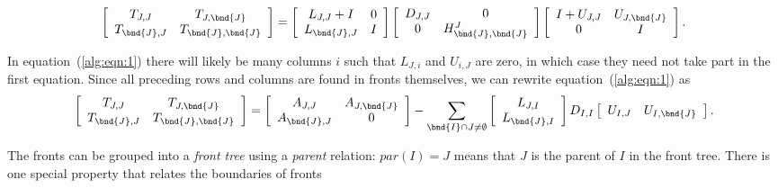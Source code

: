 \begin{equation}
\label{alg:eqn:2}
\left \lbrack \begin{array}{cc}
T_{J,J} & T_{J, \bnd{J}} \\
T_{\bnd{J},J} & T_{\bnd{J},\bnd{J}}
\end{array} \right \rbrack
=
\left \lbrack \begin{array}{cc}
L_{J,J} + I & 0 \\
L_{\bnd{J},J} & I
\end{array} \right \rbrack
\left \lbrack \begin{array}{cc}
D_{J,J} & 0 \\
0 & H_{\bnd{J},\bnd{J}}^J
\end{array} \right \rbrack
\left \lbrack \begin{array}{cc}
I + U_{J,J} & U_{J,\bnd{J}} \\
0 & I
\end{array} \right \rbrack.
\end{equation}
\par
In equation~(\ref{alg:eqn:1}) there will likely be many columns $i$ such
that $L_{J,i}$ and $U_{i,J}$ are zero, in which case they need not
take part in the first equation.
Since all preceding rows and columns are found in fronts
themselves, we can rewrite equation~(\ref{alg:eqn:1}) as
\begin{equation}
\label{alg:eqn:3}
\left \lbrack \begin{array}{cc}
T_{J,J} & T_{J, \bnd{J}} \\
T_{\bnd{J},J} & T_{\bnd{J},\bnd{J}}
\end{array} \right \rbrack
=
\left \lbrack \begin{array}{cc}
A_{J,J} & A_{J, \bnd{J}} \\
A_{\bnd{J},J} & 0
\end{array} \right \rbrack
-
\sum_{\bnd{I} \cap J \ne \emptyset}
\left \lbrack \begin{array}{c}
L_{J,I} \\
L_{\bnd{J},I}
\end{array} \right \rbrack
D_{I,I} 
\left \lbrack \begin{array}{cc}
U_{I,J} & U_{I,\bnd{J}}
\end{array} \right \rbrack.
\end{equation}
\par
The fronts can be grouped into a {\it front tree} using a {\it
parent} relation: $par(I) = J$ means that $J$ is the parent of $I$
in the front tree.
There is one special property that relates the boundaries of fronts
